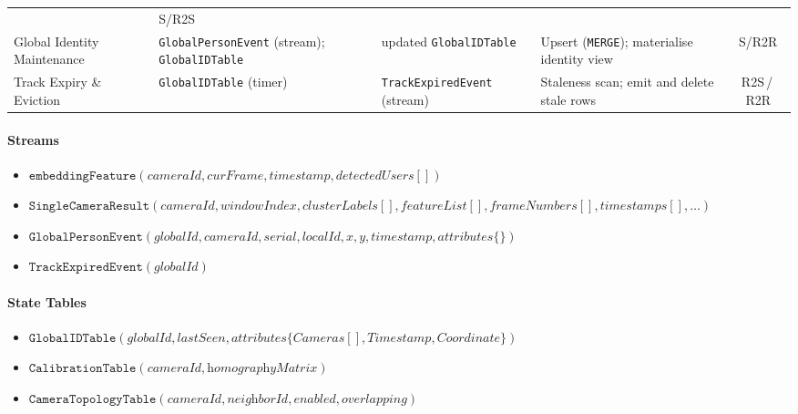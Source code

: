\documentclass[review]{elsarticle}
\begin{document}
\begin{table}[tbh!]
\begin{tabularx}{\textwidth}{@{} l X X X c @{}}
            & S/R2S \\
        \addlinespace
        Global Identity Maintenance
            & \texttt{GlobalPersonEvent} (stream); \texttt{GlobalIDTable}
            & updated \texttt{GlobalIDTable}
            & Upsert (\texttt{MERGE}); materialise identity view
            & S/R2R \\
        \addlinespace
        Track Expiry \& Eviction
            & \texttt{GlobalIDTable} (timer)
            & \texttt{TrackExpiredEvent} (stream)
            & Staleness scan; emit and delete stale rows
            & R2S\,/\,R2R \\
        \bottomrule
    \end{tabularx}
\end{table}


\paragraph{Streams}
\begin{itemize}[leftmargin=*]
    \item $\texttt{embeddingFeature}(\textit{cameraId}, \textit{curFrame}, \textit{timestamp}, \textit{detectedUsers}[])$
    \item $\texttt{SingleCameraResult}(\textit{cameraId}, \textit{windowIndex}, \textit{clusterLabels}[], \textit{featureList}[], \textit{frameNumbers}[], \textit{timestamps}[], \dots)$
    \item $\texttt{GlobalPersonEvent}(\textit{globalId}, \textit{cameraId}, \textit{serial}, \textit{localId}, \textit{x}, \textit{y}, \textit{timestamp}, \textit{attributes}\{\})$
    \item $\texttt{TrackExpiredEvent}(\textit{globalId})$
\end{itemize}

\paragraph{State Tables%
}
\begin{itemize}[leftmargin=*]
    \item $\texttt{GlobalIDTable}(\textit{globalId}, \textit{lastSeen}, \textit{attributes}\{\textit{Cameras}[], \textit{Timestamp}, \textit{Coordinate}\})$
    \item $\texttt{CalibrationTable}(\textit{cameraId}, \textit{homographyMatrix})$
    \item $\texttt{CameraTopologyTable}(\textit{cameraId}, \textit{neighborId}, \textit{enabled}, \textit{overlapping})$
\end{itemize}
\end{document}
